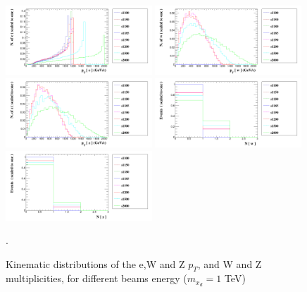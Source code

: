 \documentclass[epj,nopacs,fleqn]{svjour}
\begin{document}
\begin{figure}[!h]
	\centering
	\subfigure
	{ \includegraphics[width=0.49\textwidth]{Fig/xdxd_ee_eeZ_eveW/e_pt.png}}
	\subfigure
{ \includegraphics[width=0.49\textwidth]{Fig/xdxd_ee_eeZ_eveW/W_pt.png}}
	\subfigure
{ \includegraphics[width=0.49\textwidth]{Fig/xdxd_ee_eeZ_eveW/Z_pt.png}}
	\subfigure
{ \includegraphics[width=0.49\textwidth]{Fig/xdxd_ee_eeZ_eveW/W_m.png}}
	\subfigure
{ \includegraphics[width=0.49\textwidth]{Fig/xdxd_ee_eeZ_eveW/Z_m.png}}
	
	\caption{Kinematic distributions of the e,W and Z $p_T$, and W and Z multiplicities, for different beams energy ($m_{x_d}=1$ TeV)}.
	\label{woff_100}
\end{figure}

\clearpage
\end{document}
